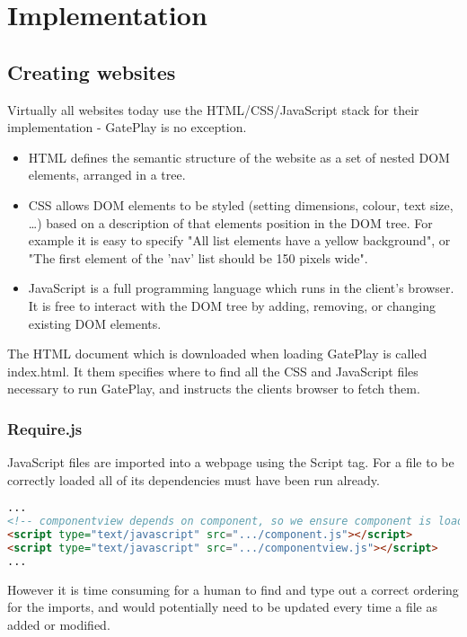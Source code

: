 \section{Implementation}
\subsection{Creating websites}
Virtually all websites today use the HTML/CSS/JavaScript stack for their implementation - GatePlay is no exception.
\begin{itemize}
	\item HTML defines the semantic structure of the website as a set of nested DOM elements, arranged in a tree.
	\item CSS allows DOM elements to be styled (setting dimensions, colour, text size, \ldots) based on a description of that elements position in the DOM tree. For example it is easy to specify "All list elements have a yellow background", or "The first element of the 'nav' list should be 150 pixels wide".
	\item JavaScript is a full programming language which runs in the client's browser. It is free to interact with the DOM tree by adding, removing, or changing existing DOM elements.
\end{itemize}

The HTML document which is downloaded when loading GatePlay is called index.html. It them specifies where to find all the CSS and JavaScript files necessary to run GatePlay, and instructs the clients browser to fetch them.

\subsubsection{Require.js}
JavaScript files are imported into a webpage using the Script tag. For a file to be correctly loaded all of its dependencies must have been run already.

\begin{lstlisting}[language=html]
...
<!-- componentview depends on component, so we ensure component is loaded first -->
<script type="text/javascript" src=".../component.js"></script>
<script type="text/javascript" src=".../componentview.js"></script>
...
\end{lstlisting}

However it is time consuming for a human to find and type out a correct ordering for the imports, and would potentially need to be updated every time a file as added or modified.


